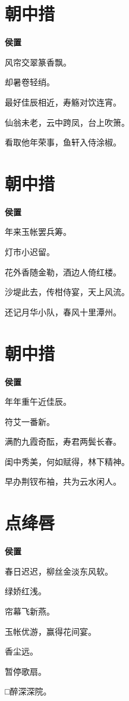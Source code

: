 \documentclass[12pt,a4paper]{ctexbook}
\begin{document}
\section{朝中措}
\textbf{侯置}\par\vspace{0.5em}
风帘交翠篆香飘。\par
却暑卷轻绡。\par
最好佳辰相近，寿觞对饮连宵。\par
仙翁未老，云中跨凤，台上吹箫。\par
看取他年荣事，鱼轩入侍涂椒。\par

\section{朝中措}
\textbf{侯置}\par\vspace{0.5em}
年来玉帐罢兵筹。\par
灯市小迟留。\par
花外香随金勒，酒边人倚红楼。\par
沙堤此去，传柑侍宴，天上风流。\par
还记月华小队，春风十里潭州。\par

\section{朝中措}
\textbf{侯置}\par\vspace{0.5em}
年年重午近佳辰。\par
符艾一番新。\par
满酌九霞奇酝，寿君两鬓长春。\par
闺中秀美，何如赋得，林下精神。\par
早办荆钗布袖，共为云水闲人。\par

\section{点绛唇}
\textbf{侯置}\par\vspace{0.5em}
春日迟迟，柳丝金淡东风软。\par
绿娇红浅。\par
帘幕飞新燕。\par
玉帐优游，赢得花间宴。\par
香尘远。\par
暂停歌扇。\par
□醉深深院。\par
\end{document}
